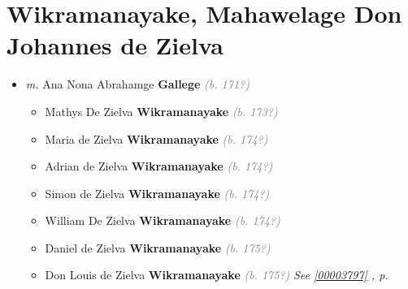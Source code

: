 \documentclass[10pt, openany]{book}
\begin{document}
\chapter{Wikramanayake, Mahawelage Don Johannes de Zielva}
\label{00003789}
\textcolor{slmaroon}{\textit{}}
\begin{itemize}
\item{\textit{m.} Ana Nona Abrahamge \textbf{Gallege} \textcolor{gray}{\textit{(b. 171?)}}   \label{couple:00003789:00003790} \begin{itemize}
\item{Mathys De Zielva \textbf{Wikramanayake} \textcolor{gray}{\textit{(b. 173?)}}
   }
\item{Maria de Zielva \textbf{Wikramanayake} \textcolor{gray}{\textit{(b. 174?)}}
   }
\item{Adrian de Zielva \textbf{Wikramanayake} \textcolor{gray}{\textit{(b. 174?)}}
   }
\item{Simon de Zielva \textbf{Wikramanayake} \textcolor{gray}{\textit{(b. 174?)}}
   }
\item{William De Zielva \textbf{Wikramanayake} \textcolor{gray}{\textit{(b. 174?)}}
   }
\item{Daniel de Zielva \textbf{Wikramanayake} \textcolor{gray}{\textit{(b. 175?)}}
   }
\item{Don Louis de Zielva \textbf{Wikramanayake} \textcolor{gray}{\textit{(b. 175?)}} \textcolor{slteal}{\textit{See  \autoref{00003797} \textit{, p. \pageref{00003797} }}}}
\end{itemize}}
\end{itemize}
     
\end{document}
